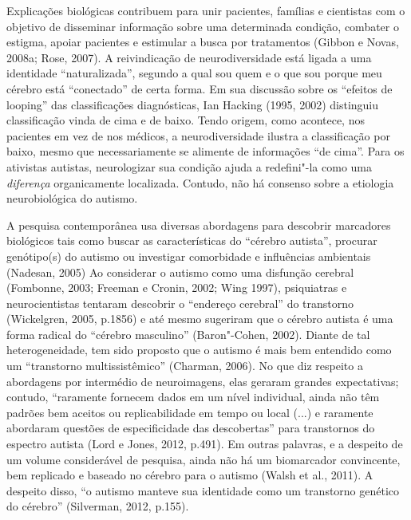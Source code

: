 Explicações biológicas contribuem para unir pacientes, famílias e
cientistas com o objetivo de disseminar informação sobre uma determinada
condição, combater o estigma, apoiar pacientes e estimular a busca por
tratamentos (Gibbon e Novas, 2008a; Rose, 2007). A reivindicação de
neurodiversidade está ligada a uma identidade ``naturalizada'', segundo
a qual sou quem e o que sou porque meu cérebro está ``conectado'' de
certa forma. Em sua discussão sobre os ``efeitos de looping'' das
classificações diagnósticas, Ian Hacking (1995, 2002) distinguiu
classificação vinda de cima e de baixo. Tendo origem, como acontece, nos
pacientes em vez de nos médicos, a neurodiversidade ilustra a
classificação por baixo, mesmo que necessariamente se alimente de
informações ``de cima''. Para os ativistas autistas, neurologizar sua
condição ajuda a redefini"-la como uma \emph{diferença} organicamente
localizada. Contudo, não há consenso sobre a etiologia neurobiológica do
autismo.

A pesquisa contemporânea usa diversas abordagens para descobrir
marcadores biológicos tais como buscar as características do ``cérebro
autista'', procurar genótipo(s) do autismo ou investigar comorbidade e
influências ambientais (Nadesan, 2005) Ao considerar o autismo como uma
disfunção cerebral (Fombonne, 2003; Freeman e Cronin, 2002; Wing 1997),
psiquiatras e neurocientistas tentaram descobrir o ``endereço cerebral''
do transtorno (Wickelgren, 2005, p.1856) e até mesmo sugeriram que o
cérebro autista é uma forma radical do ``cérebro masculino''
(Baron"-Cohen, 2002). Diante de tal heterogeneidade, tem sido proposto
que o autismo é mais bem entendido como um ``transtorno
multissistêmico'' (Charman, 2006). No que diz respeito a abordagens por
intermédio de neuroimagens, elas geraram grandes expectativas; contudo,
``raramente fornecem dados em um nível individual, ainda não têm padrões
bem aceitos ou replicabilidade em tempo ou local (...) e raramente
abordaram questões de especificidade das descobertas'' para transtornos
do espectro autista (Lord e Jones, 2012, p.491). Em outras palavras, e a
despeito de um volume considerável de pesquisa, ainda não há um
biomarcador convincente, bem replicado e baseado no cérebro para o
autismo (Walsh et al., 2011). A despeito disso, ``o autismo manteve sua
identidade como um transtorno genético do cérebro'' (Silverman, 2012,
p.155).

